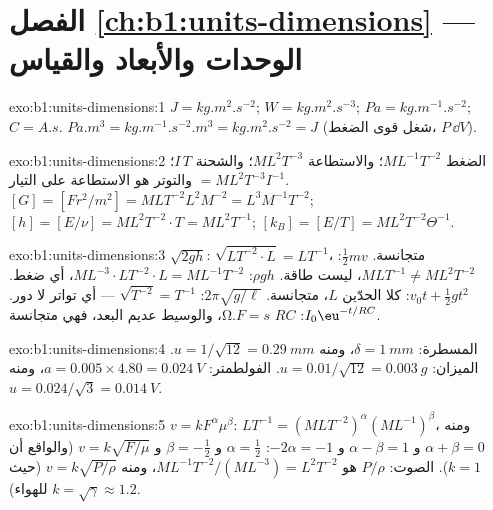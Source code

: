 \section*{الفصل \ref{ch:b1:units-dimensions} --- الوحدات والأبعاد والقياس}

\begin{solution}{exo:b1:units-dimensions:1}
$\unit{J} = \unit{kg.m^2.s^{-2}}$; $\unit{W} = \unit{kg.m^2.s^{-3}}$;
$\unit{Pa} = \unit{kg.m^{-1}.s^{-2}}$; $\unit{C} = \unit{A.s}$.
$\unit{Pa.m^3} = \unit{kg.m^{-1}.s^{-2}.m^3} = \unit{kg.m^2.s^{-2}} = \unit{J}$
(شغل قوى الضغط، $P\,\dd V$).
\end{solution}

\begin{solution}{exo:b1:units-dimensions:2}
الضغط $M L^{-1} T^{-2}$؛ والاستطاعة $M L^2 T^{-3}$؛ والشحنة $I\,T$؛
والتوتر هو الاستطاعة على التيار $= M L^2 T^{-3} I^{-1}$.
$[G] = [F r^2/m^2] = M L T^{-2} L^2 M^{-2} = L^3 M^{-1} T^{-2}$;
$[h] = [E/\nu] = M L^2 T^{-2} \cdot T = M L^2 T^{-1}$;
$[k_B] = [E/T] = M L^2 T^{-2} \Theta^{-1}$.
\end{solution}

\begin{solution}{exo:b1:units-dimensions:3}
$\sqrt{2gh}$: $\sqrt{L T^{-2} \cdot L} = L T^{-1}$، متجانسة.
$\tfrac12 mv$: $M L T^{-1} \neq M L^2 T^{-2}$، ليست طاقة.
$\rho g h$: $M L^{-3} \cdot L T^{-2} \cdot L = M L^{-1} T^{-2}$، أي ضغط.
$v_0 t + \tfrac12 g t^2$: كلا الحدّين $L$، متجانسة.
$2\pi\sqrt{g/\ell}$: $\sqrt{T^{-2}} = T^{-1}$ --- أي تواتر لا دور.
$I_0\eu^{-t/RC}$: $RC$  $\unit{\ohm.F} = \unit{s}$، والوسيط عديم البعد، فهي متجانسة.
\end{solution}

\begin{solution}{exo:b1:units-dimensions:4}
المسطرة: $\delta = \qty{1}{mm}$، ومنه $u = 1/\sqrt{12} = \qty{0.29}{mm}$.
الميزان: $u = 0.01/\sqrt{12} = \qty{0.003}{g}$.
الفولطمتر: $a = 0.005 \times 4.80 = \qty{0.024}{V}$، ومنه
$u = 0.024/\sqrt3 = \qty{0.014}{V}$.
\end{solution}

\begin{solution}{exo:b1:units-dimensions:5}
$v = k F^\alpha \mu^\beta$: $L T^{-1} = (M L T^{-2})^\alpha (M L^{-1})^\beta$،
ومنه $\alpha + \beta = 0$ و $\alpha - \beta = 1$ و $-2\alpha = -1$:
$\alpha = \tfrac12$ و $\beta = -\tfrac12$ و $v = k\sqrt{F/\mu}$ (والواقع أن $k = 1$).
الصوت:  $P/\rho$ هو $M L^{-1} T^{-2} / (M L^{-3}) = L^2 T^{-2}$،
ومنه $v = k\sqrt{P/\rho}$ (حيث $k = \sqrt\gamma \approx 1.2$ للهواء).
\end{solution}

